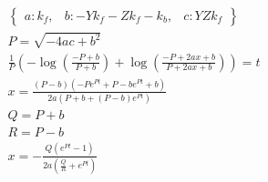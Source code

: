 \begin{align}
  \begin{Bmatrix}a : k_{f}, & b : - Y k_{f} - Z k_{f} - k_{b}, & c : Y Z k_{f}\end{Bmatrix} \\
  P = \sqrt{- 4 a c + b^{2}} \\
  \frac{1}{P} \left(- \log{\left (\frac{- P + b}{P + b} \right )} + \log{\left (\frac{- P + 2 a x + b}{P + 2 a x + b} \right )}\right) = t \\
  x = \frac{\left(P - b\right) \left(- P e^{P t} + P - b e^{P t} + b\right)}{2 a \left(P + b + \left(P - b\right) e^{P t}\right)} \\
  Q = P + b \\
  R = P - b \\
  x = - \frac{Q \left(e^{P t} - 1\right)}{2 a \left(\frac{Q}{R} + e^{P t}\right)}
\end{align}
